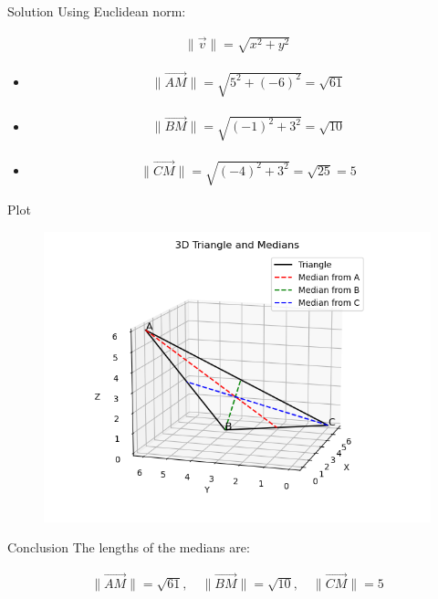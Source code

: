 \documentclass{beamer}
\begin{document}
\begin{frame}{Solution}
Using Euclidean norm:


\begin{align}
\|\vec{v}\| = \sqrt{x^2 + y^2}
\end{align}


\begin{itemize}
    \item \begin{align} \|\vec{AM}\| = \sqrt{5^2 + (-6)^2} = \sqrt{61} \end{align}
    \item \begin{align} \|\vec{BM}\| = \sqrt{(-1)^2 + 3^2} = \sqrt{10} \end{align}
    \item \begin{align} \|\vec{CM}\| = \sqrt{(-4)^2 + 3^2} = \sqrt{25} = 5 \end{align}
\end{itemize}
\end{frame}

\begin{frame}{Plot}
\begin{figure}
    \centering
    \includegraphics[width=0.75\linewidth]{./figs/Figure_1.png}
    \caption{}
    \label{fig:fig1}
\end{figure}    
\end{frame}

\begin{frame}{Conclusion}
The lengths of the medians are:


\begin{align}
\boxed{
\|\vec{AM}\| = \sqrt{61}, \quad
\|\vec{BM}\| = \sqrt{10}, \quad
\|\vec{CM}\| = 5
}
\end{align}
\end{frame}
\end{document}

